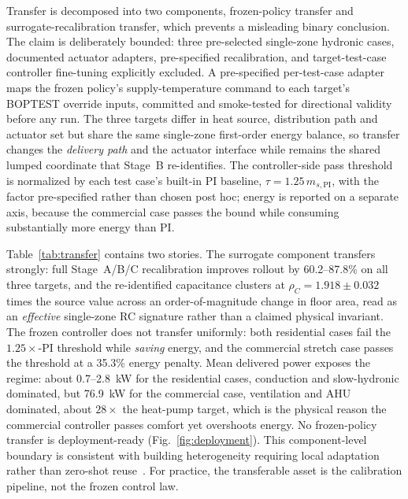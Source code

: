 Transfer is decomposed into two components, frozen-policy transfer and surrogate-recalibration
transfer, which prevents a misleading binary conclusion. The claim is deliberately bounded: three
pre-selected single-zone hydronic cases, documented actuator adapters, pre-specified recalibration,
and target-test-case controller fine-tuning explicitly excluded. A pre-specified per-test-case
adapter maps the frozen policy's supply-temperature command to each target's BOPTEST override
inputs, committed and smoke-tested for directional validity before any run. The three targets differ
in heat source, distribution path and actuator set but share the same single-zone first-order energy
balance, so transfer changes the \emph{delivery path} and the actuator interface while \Czon{}
remains the shared lumped coordinate that Stage~B re-identifies. The controller-side pass
threshold
is normalized by each test case's built-in PI baseline, $\tau=1.25\,m_{s,\mathrm{PI}}$, with the
factor pre-specified rather than chosen post hoc; energy is reported on a separate axis, because the
commercial case passes the \ms{} bound while consuming substantially more energy than PI.

Table~\ref{tab:transfer} contains two stories. The surrogate component transfers strongly: full
Stage~A/B/C recalibration improves rollout \RMSE{} by 60.2--87.8\% on all three targets, and the
re-identified capacitance clusters at $\rho_C=1.918\pm0.032$ times the source value across an
order-of-magnitude change in floor area, read as an \emph{effective} single-zone RC signature rather
than a claimed physical invariant. The frozen controller does not transfer uniformly: both
residential cases fail the $1.25\times$-PI threshold while \emph{saving} energy, and the commercial
stretch case passes the threshold at a 35.3\% energy penalty. Mean delivered power exposes the
regime: about 0.7--2.8~kW for the residential cases, conduction and slow-hydronic dominated, but
76.9~kW for the commercial case, ventilation and AHU dominated, about $28\times$ the heat-pump
target, which is the physical reason the commercial controller passes comfort yet overshoots energy.
No frozen-policy transfer is deployment-ready (Fig.~\ref{fig:deployment}). This component-level
boundary is consistent with building heterogeneity requiring local adaptation rather than zero-shot
reuse~\cite{Coraci2024HeteroTL,Coraci2025HiLo}. For practice, the transferable asset is the
calibration pipeline, not the frozen control law.


